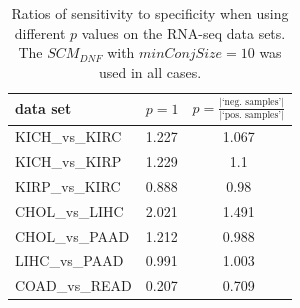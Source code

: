\begin{table}[H]
    \centering
    \caption{Ratios of sensitivity to specificity when using different \(p\) values on the RNA-seq data sets. The \(SCM_{DNF}\) with \(minConjSize = 10\) was used in all cases.}\label{tab:genePMiddle}
    \begin{tabular}{llc}
            \toprule
            data set & \(p=1\) & \(p=\frac{|\text{`neg.\ samples'}|}{|\text{`pos.\ samples'}|}\) \\
            \midrule
            KICH\_vs\_KIRC & 1.227 & 1.067 \\
            KICH\_vs\_KIRP & 1.229 & 1.1 \\
            KIRP\_vs\_KIRC & 0.888 & 0.98 \\
            CHOL\_vs\_LIHC & 2.021 & 1.491 \\
            CHOL\_vs\_PAAD & 1.212 & 0.988 \\
            LIHC\_vs\_PAAD & 0.991 & 1.003 \\
            COAD\_vs\_READ & 0.207 & 0.709 \\
            \bottomrule
    \end{tabular}
\end{table}

